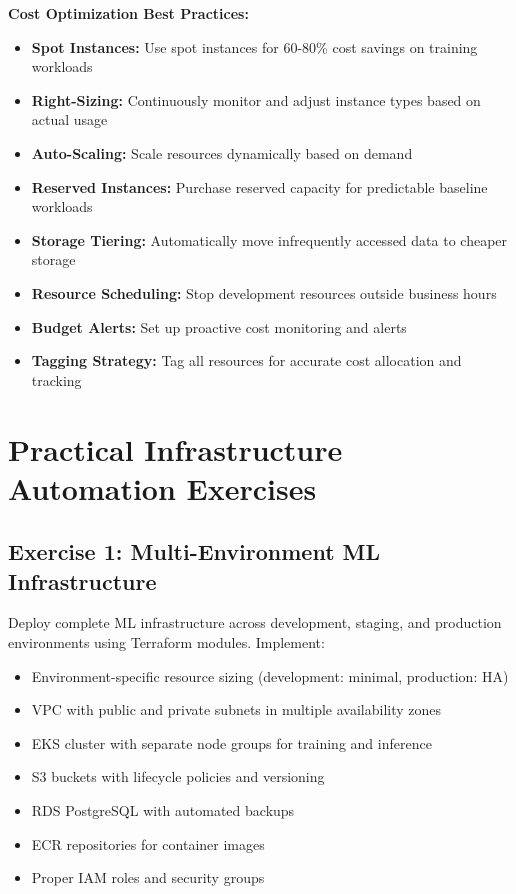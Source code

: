 \textbf{Cost Optimization Best Practices:}

\begin{itemize}
    \item \textbf{Spot Instances:} Use spot instances for 60-80\% cost savings on training workloads
    \item \textbf{Right-Sizing:} Continuously monitor and adjust instance types based on actual usage
    \item \textbf{Auto-Scaling:} Scale resources dynamically based on demand
    \item \textbf{Reserved Instances:} Purchase reserved capacity for predictable baseline workloads
    \item \textbf{Storage Tiering:} Automatically move infrequently accessed data to cheaper storage
    \item \textbf{Resource Scheduling:} Stop development resources outside business hours
    \item \textbf{Budget Alerts:} Set up proactive cost monitoring and alerts
    \item \textbf{Tagging Strategy:} Tag all resources for accurate cost allocation and tracking
\end{itemize}

\section{Practical Infrastructure Automation Exercises}

\subsection{Exercise 1: Multi-Environment ML Infrastructure}

Deploy complete ML infrastructure across development, staging, and production environments using Terraform modules. Implement:

\begin{itemize}
    \item Environment-specific resource sizing (development: minimal, production: HA)
    \item VPC with public and private subnets in multiple availability zones
    \item EKS cluster with separate node groups for training and inference
    \item S3 buckets with lifecycle policies and versioning
    \item RDS PostgreSQL with automated backups
    \item ECR repositories for container images
    \item Proper IAM roles and security groups
\end{itemize}

